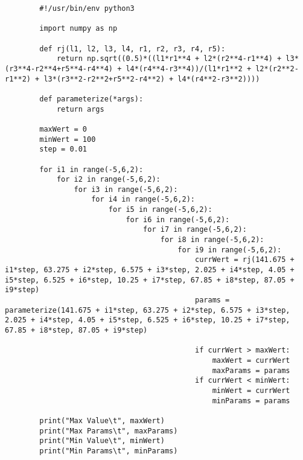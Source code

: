     \begin{verbatim}
        #!/usr/bin/env python3

        import numpy as np

        def rj(l1, l2, l3, l4, r1, r2, r3, r4, r5):
            return np.sqrt((0.5)*((l1*r1**4 + l2*(r2**4-r1**4) + l3*(r3**4-r2**4+r5**4-r4**4) + l4*(r4**4-r3**4))/(l1*r1**2 + l2*(r2**2-r1**2) + l3*(r3**2-r2**2+r5**2-r4**2) + l4*(r4**2-r3**2))))

        def parameterize(*args):
            return args

        maxWert = 0
        minWert = 100
        step = 0.01

        for i1 in range(-5,6,2):
            for i2 in range(-5,6,2):
                for i3 in range(-5,6,2):
                    for i4 in range(-5,6,2):
                        for i5 in range(-5,6,2):
                            for i6 in range(-5,6,2):
                                for i7 in range(-5,6,2):
                                    for i8 in range(-5,6,2):
                                        for i9 in range(-5,6,2):
                                            currWert = rj(141.675 + i1*step, 63.275 + i2*step, 6.575 + i3*step, 2.025 + i4*step, 4.05 + i5*step, 6.525 + i6*step, 10.25 + i7*step, 67.85 + i8*step, 87.05 + i9*step)
                                            params = parameterize(141.675 + i1*step, 63.275 + i2*step, 6.575 + i3*step, 2.025 + i4*step, 4.05 + i5*step, 6.525 + i6*step, 10.25 + i7*step, 67.85 + i8*step, 87.05 + i9*step)

                                            if currWert > maxWert:
                                                maxWert = currWert
                                                maxParams = params
                                            if currWert < minWert:
                                                minWert = currWert
                                                minParams = params

        print("Max Value\t", maxWert)
        print("Max Params\t", maxParams)
        print("Min Value\t", minWert)
        print("Min Params\t", minParams)
    \end{verbatim}

